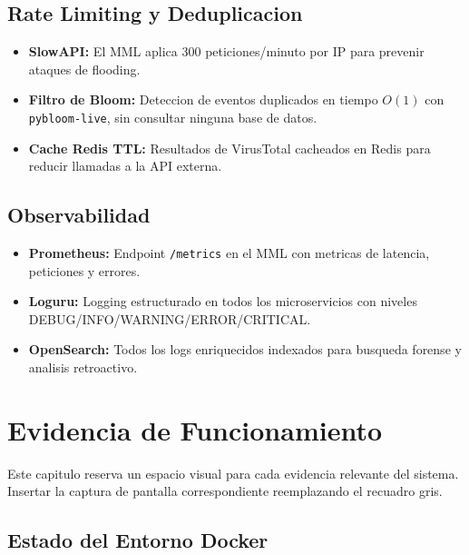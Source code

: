 \documentclass[12pt, a4paper]{report}
\begin{document}
\section{Rate Limiting y Deduplicacion}

\begin{itemize}[leftmargin=2em]
    \item \textbf{SlowAPI:} El MML aplica 300 peticiones/minuto por IP para prevenir ataques de flooding.
    \item \textbf{Filtro de Bloom:} Deteccion de eventos duplicados en tiempo $O(1)$ con \texttt{pybloom-live}, sin consultar ninguna base de datos.
    \item \textbf{Cache Redis TTL:} Resultados de VirusTotal cacheados en Redis para reducir llamadas a la API externa.
\end{itemize}

\section{Observabilidad}

\begin{itemize}[leftmargin=2em]
    \item \textbf{Prometheus:} Endpoint \texttt{/metrics} en el MML con metricas de latencia, peticiones y errores.
    \item \textbf{Loguru:} Logging estructurado en todos los microservicios con niveles DEBUG/INFO/WARNING/ERROR/CRITICAL.
    \item \textbf{OpenSearch:} Todos los logs enriquecidos indexados para busqueda forense y analisis retroactivo.
\end{itemize}

\chapter{Evidencia de Funcionamiento}

Este capitulo reserva un espacio visual para cada evidencia relevante del sistema. Insertar la captura de pantalla correspondiente reemplazando el recuadro gris.

\section{Estado del Entorno Docker}
\end{document}
